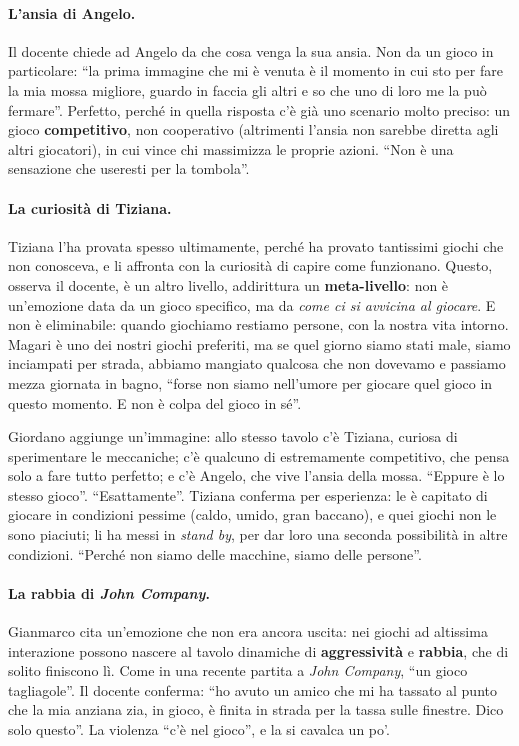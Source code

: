 \paragraph{L'ansia di Angelo.} Il docente chiede ad Angelo da che cosa venga la sua
ansia. Non da un gioco in particolare: ``la prima immagine che mi è venuta è il
momento in cui sto per fare la mia mossa migliore, guardo in faccia gli altri e so
che uno di loro me la può fermare''. Perfetto, perché in quella risposta c'è già uno
scenario molto preciso: un gioco \textbf{competitivo}, non cooperativo (altrimenti
l'ansia non sarebbe diretta agli altri giocatori), in cui vince chi massimizza le
proprie azioni. ``Non è una sensazione che useresti per la tombola''.

\paragraph{La curiosità di Tiziana.} Tiziana l'ha provata spesso ultimamente,
perché ha provato tantissimi giochi che non conosceva, e li affronta con la
curiosità di capire come funzionano. Questo, osserva il docente, è un altro
livello, addirittura un \textbf{meta-livello}: non è un'emozione data da un gioco
specifico, ma da \emph{come ci si avvicina al giocare}. E non è eliminabile:
quando giochiamo restiamo persone, con la nostra vita intorno. Magari è uno dei
nostri giochi preferiti, ma se quel giorno siamo stati male, siamo inciampati per
strada, abbiamo mangiato qualcosa che non dovevamo e passiamo mezza giornata in
bagno, ``forse non siamo nell'umore per giocare quel gioco in questo momento. E non
è colpa del gioco in sé''.

Giordano aggiunge un'immagine: allo stesso tavolo c'è Tiziana, curiosa di
sperimentare le meccaniche; c'è qualcuno di estremamente competitivo, che pensa solo
a fare tutto perfetto; e c'è Angelo, che vive l'ansia della mossa. ``Eppure è lo
stesso gioco''. ``Esattamente''. Tiziana conferma per esperienza: le è capitato di
giocare in condizioni pessime (caldo, umido, gran baccano), e quei giochi non le sono
piaciuti; li ha messi in \emph{stand by}, per dar loro una seconda possibilità in
altre condizioni. ``Perché non siamo delle macchine, siamo delle persone''.

\paragraph{La rabbia di \emph{John Company}.} Gianmarco cita un'emozione che non era
ancora uscita: nei giochi ad altissima interazione possono nascere al tavolo
dinamiche di \textbf{aggressività} e \textbf{rabbia}, che di solito finiscono lì.
Come in una recente partita a \emph{John Company}, ``un gioco tagliagole''.
Il docente conferma: ``ho avuto un amico che mi ha tassato al punto che la mia
anziana zia, in gioco, è finita in strada per la tassa sulle finestre. Dico solo
questo''. La violenza ``c'è nel gioco'', e la si cavalca un po'.

